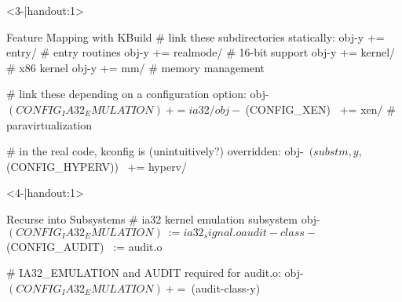 \begin{frame}[fragile,t]{\myframetitle}
\begin{fancycolumns}[t]
\begin{onlyenv}
		\end{onlyenv}
		\begin{uncoverenv}<3-|handout:1>
			\begin{kbuildtight}[basicstyle=\small]{Feature Mapping with KBuild }
# link these subdirectories statically:
obj-y += entry/ # entry routines
obj-y += realmode/ # 16-bit support
obj-y += kernel/ # x86 kernel
obj-y += mm/ # memory management

# link these depending on a configuration option:
obj-~$(CONFIG_IA32_EMULATION)~ += ia32/
obj-~$(CONFIG_XEN)~ += xen/ # paravirtualization

# in the real code, kconfig is (unintuitively?) overridden:
obj-~$(subst m,y,$(CONFIG_HYPERV))~ += hyperv/
			\end{kbuildtight}
		\end{uncoverenv}
		\begin{uncoverenv}<4-|handout:1>
			\begin{kbuildtight}[basicstyle=\small]{Recurse into Subsystems}
# ia32 kernel emulation subsystem
obj-~$(CONFIG_IA32_EMULATION)~ := ia32_signal.o
audit-class-~$(CONFIG_AUDIT)~ := audit.o

# IA32_EMULATION and AUDIT required for audit.o:
obj-~$(CONFIG_IA32_EMULATION)~ += ~$(audit-class-y)~
			\end{kbuildtight}
		\end{uncoverenv}
	\end{fancycolumns}
\end{frame}

